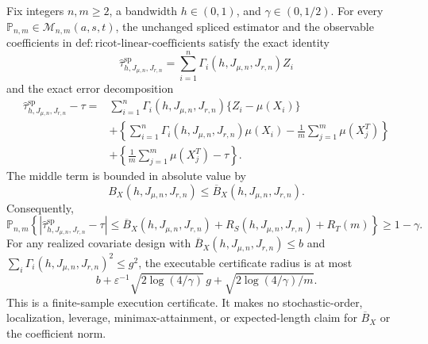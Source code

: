 Fix integers \(n,m\ge2\), a bandwidth \(h\in(0,1)\), and \(\gamma\in(0,1/2)\). For every \(\mathbb P_{n,m}\in\mathcal M_{n,m}(a,s,t)\), the unchanged spliced estimator and the observable coefficients in \(\mathrm{def:ricot\text{-}linear\text{-}coefficients}\) satisfy the exact identity
\[
\widehat\tau^{\mathrm{sp}}_{h,J_{\mu,n},J_{r,n}}=\sum_{i=1}^n\Gamma_i(h,J_{\mu,n},J_{r,n})Z_i
\]
and the exact error decomposition
\[
\begin{aligned}
\widehat\tau^{\mathrm{sp}}_{h,J_{\mu,n},J_{r,n}}-\tau
={}&\sum_{i=1}^n\Gamma_i(h,J_{\mu,n},J_{r,n})\{Z_i-\mu(X_i)\}\\
&+\left\{\sum_{i=1}^n\Gamma_i(h,J_{\mu,n},J_{r,n})\mu(X_i)-\frac1m\sum_{j=1}^m\mu(X_j^T)\right\}\\
&+\left\{\frac1m\sum_{j=1}^m\mu(X_j^T)-\tau\right\}.
\end{aligned}
\]
The middle term is bounded in absolute value by
\[
B_X(h,J_{\mu,n},J_{r,n})\le\overline B_X(h,J_{\mu,n},J_{r,n}).
\]
Consequently,
\[
\mathbb P_{n,m}\!\left\{\left|\widehat\tau^{\mathrm{sp}}_{h,J_{\mu,n},J_{r,n}}-\tau\right|
\le \overline B_X(h,J_{\mu,n},J_{r,n})+R_S(h,J_{\mu,n},J_{r,n})+R_T(m)\right\}\ge1-\gamma.
\]
For any realized covariate design with \(\overline B_X(h,J_{\mu,n},J_{r,n})\le b\) and \(\sum_i\Gamma_i(h,J_{\mu,n},J_{r,n})^2\le g^2\), the executable certificate radius is at most
\[
b+\varepsilon^{-1}\sqrt{2\log(4/\gamma)}\,g+\sqrt{2\log(4/\gamma)/m}.
\]
This is a finite-sample execution certificate. It makes no stochastic-order, localization, leverage, minimax-attainment, or expected-length claim for \(\overline B_X\) or the coefficient norm.